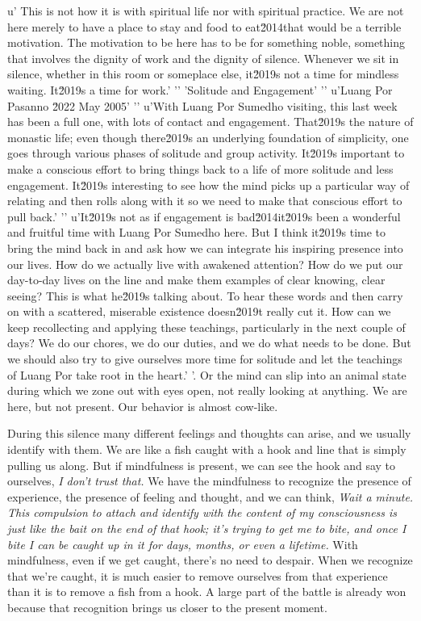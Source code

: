 {u' This is not how it is with spiritual life nor with spiritual practice. We are not here merely to have a place to stay and food to eat\u2014that would be a terrible motivation. The motivation to be here has to be for something noble, something that involves the dignity of work and the dignity of silence. Whenever we sit in silence, whether in this room or someplace else, it\u2019s not a time for mindless waiting. It\u2019s a time for work.'
'\n'
'Solitude and Engagement'
'\n'
u'Luang Por Pasanno \u2022 May 2005'
'\n'
u'With Luang Por Sumedho visiting, this last week has been a full one, with lots of contact and engagement. That\u2019s the nature of monastic life; even though there\u2019s an underlying foundation of simplicity, one goes through various phases of solitude and group activity. It\u2019s important to make a conscious effort to bring things back to a life of more solitude and less engagement. It\u2019s interesting to see how the mind picks up a particular way of relating and then rolls along with it so we need to make that conscious effort to pull back.'
'\n'
u'It\u2019s not as if engagement is bad\u2014it\u2019s been a wonderful and fruitful time with Luang Por Sumedho here. But I think it\u2019s time to bring the mind back in and ask how we can integrate his inspiring presence into our lives. How do we actually live with awakened attention? How do we put our day-to-day lives on the line and make them examples of clear knowing, clear seeing? This is what he\u2019s talking about. To hear these words and then carry on with a scattered, miserable existence doesn\u2019t really cut it. How can we keep recollecting and applying these teachings, particularly in the next couple of days? We do our chores, we do our duties, and we do what needs to be done. But we should also try to give ourselves more time for solitude and let the teachings of Luang Por take root in the heart.'
'\e.} Or the mind can slip into an animal state 
during which we zone out with eyes open, not really looking at 
anything. We are here, but not present. Our behavior is almost cow-like.

During this silence many different feelings and thoughts can arise, and 
we usually identify with them. We are like a fish caught with a hook 
and line that is simply pulling us along. But if mindfulness is 
present, we can see the hook and say to ourselves, \emph{I don't trust 
that.} We have the mindfulness to recognize the presence of experience, 
the presence of feeling and thought, and we can think, \emph{Wait a 
minute. This compulsion to attach and identify with the content of my 
consciousness is just like the bait on the end of that hook; it's 
trying to get me to bite, and once I bite I can be caught up in it for 
days, months, or even a lifetime.} With mindfulness, even if we get 
caught, there's no need to despair. When we recognize that we're 
caught, it is much easier to remove ourselves from that experience than 
it is to remove a fish from a hook. A large part of the battle is 
already won because that recognition brings us closer to the present 
moment.

